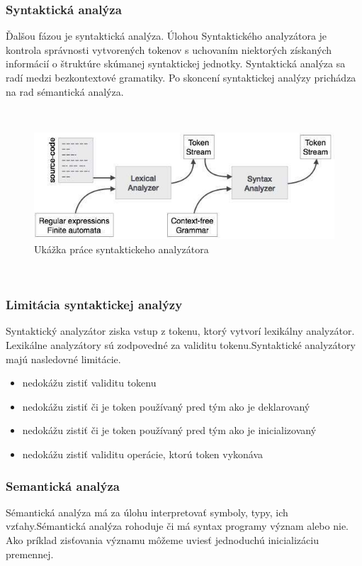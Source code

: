 \subsubsection{Syntaktická analýza}
\indent Ďalšou fázou je syntaktická analýza. Úlohou Syntaktického analyzátora je kontrola správnosti vytvorených tokenov s uchovaním niektorých získaných informácií o štruktúre skúmanej syntaktickej jednotky. Syntaktická analýza sa radí medzi bezkontextové gramatiky. Po skoncení syntaktickej analýzy prichádza na rad sémantická analýza.\cite{gram}

 \newline
  \newline
\begin{figure}[!htbp]
	\centering
	\includegraphics[width=15cm]{img/syntax_analyzer.jpg}
	\caption{Ukážka práce syntaktickeho  analyzátora}
	\label{fig:test}
\end{figure}
 \newline
 \newpage
\subsubsection{Limitácia syntaktickej analýzy}
\indent Syntaktický analyzátor ziska vstup z tokenu, ktorý vytvorí lexikálny analyzátor. Lexikálne analyzátory sú zodpovedné za validitu tokenu.Syntaktické analyzátory majú nasledovné limitácie.

\begin{itemize}
	\item nedokážu zistiť validitu tokenu
	\item nedokážu zistiť či je token používaný pred tým ako je deklarovaný
	\item nedokážu zistiť či je token používaný pred tým ako je inicializovaný
	\item nedokážu zistiť validitu operácie, ktorú token vykonáva
\end{itemize}



\subsubsection{Semantická  analýza}
\indent Sémantická analýza má za úlohu interpretovať symboly, typy, ich vzťahy.Sémantická analýza rohoduje či má syntax programy význam alebo nie.
Ako príklad zisťovania významu môžeme uviesť jednoduchú inicializáciu premennej.\cite{gram}

